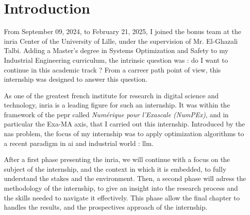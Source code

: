 \chapter*{Introduction}
\glsresetall

From September 09, 2024, to February 21, 2025, I joined the \gls{bonus} team at the \acrshort{inria} Center of the University of Lille, under the supervision of Mr. El-Ghazali Talbi. Adding a Master's degree in Systems Optimization and Safety to my Industrial Engineering curriculum, the intrinsic question was : do I want to continue in this academic track ? From a carreer path point of view, this internship was designed to answer this question.

As one of the greatest french institute for research in digital science and technology, \acrshort{inria} is a leading figure for such an internship. It was within the framework of the \gls{pepr} called \textit{Numérique pour l'Exascale (NumPEx)}, and in particular the Exa-MA axis, that I carried out this internship. Introduced by the \gls{nas} problem, the focus of my internship was to apply optimization algorithms to a recent paradigm in \gls{ai} and industrial world : \gls{llm}.

After a first phase presenting the \acrshort{inria}, we will continue with a focus on the subject of the internship, and the context in which it is embedded, to fully understand the stakes and the environment. Then, a second phase will adress the methodology of the internship, to give an insight into the research process and the skills needed to navigate it effectively. This phase allow the final chapter to handles the results, and the prospectives approach of the internship.

